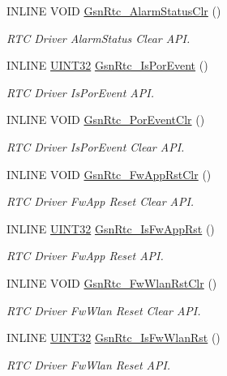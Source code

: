 \begin{DoxyCompactItemize}
INLINE VOID \hyperlink{a00651_gaa52a7c31e385f908bda2607f4d069696}{GsnRtc\_\-AlarmStatusClr} ()
\begin{DoxyCompactList}\small\item\em RTC Driver AlarmStatus Clear API. \end{DoxyCompactList}\item 
INLINE \hyperlink{a00660_gae1e6edbbc26d6fbc71a90190d0266018}{UINT32} \hyperlink{a00651_gaa9261c1d12f3040818e2b433f1d9643e}{GsnRtc\_\-IsPorEvent} ()
\begin{DoxyCompactList}\small\item\em RTC Driver IsPorEvent API. \end{DoxyCompactList}\item 
INLINE VOID \hyperlink{a00651_ga4ccf506d6700a1107e70eb8044f6cc22}{GsnRtc\_\-PorEventClr} ()
\begin{DoxyCompactList}\small\item\em RTC Driver IsPorEvent Clear API. \end{DoxyCompactList}\item 
INLINE VOID \hyperlink{a00651_ga7bf5618aa3aa43eb2dccc62f1c66cd37}{GsnRtc\_\-FwAppRstClr} ()
\begin{DoxyCompactList}\small\item\em RTC Driver FwApp Reset Clear API. \end{DoxyCompactList}\item 
INLINE \hyperlink{a00660_gae1e6edbbc26d6fbc71a90190d0266018}{UINT32} \hyperlink{a00651_gaa5d760275a8669e3b861bee05767cd26}{GsnRtc\_\-IsFwAppRst} ()
\begin{DoxyCompactList}\small\item\em RTC Driver FwApp Reset API. \end{DoxyCompactList}\item 
INLINE VOID \hyperlink{a00651_ga8a8abb14d43d7af443c2e07b342b3f4e}{GsnRtc\_\-FwWlanRstClr} ()
\begin{DoxyCompactList}\small\item\em RTC Driver FwWlan Reset Clear API. \end{DoxyCompactList}\item 
INLINE \hyperlink{a00660_gae1e6edbbc26d6fbc71a90190d0266018}{UINT32} \hyperlink{a00651_ga54506f747cfe33c09c82f934cf1d6cbc}{GsnRtc\_\-IsFwWlanRst} ()
\begin{DoxyCompactList}\small\item\em RTC Driver FwWlan Reset API. \end{DoxyCompactList}\item 

\end{DoxyCompactItemize}
